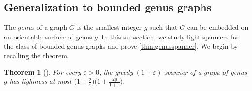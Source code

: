 \documentclass[a4paper,cleveref, autoref, thm-restate, thm-restate, UKenglish]{lipics-v2021}
\renewcommand{\epsilon}{\varepsilon}
\begin{document}
\subsection{Generalization to bounded genus graphs}\label{sec:genaral:to:bd:genus}

The \emph{genus} of a graph $G$ is the smallest integer $g$ such that $G$ can be embedded on an orientable surface of genus $g$. 
In this subsection, we study light spanners for the class of bounded genus graphs and prove \cref{thm:genusspanner}. 
We begin by recalling the theorem.


\newtheorem{restatedtheorem}{Theorem}
\setcounter{restatedtheorem}{\value{restatecounter}}


\begin{restatedtheorem}[]
For every $\epsilon>0$, the greedy $(1+\epsilon)$-spanner of a graph of genus $g$ has lightness at most $\bigl( 1+\frac{2}{\epsilon} \bigl) \bigl(1+\frac{2g}{1+\epsilon} \bigl)$.
\end{restatedtheorem}
\end{document}
